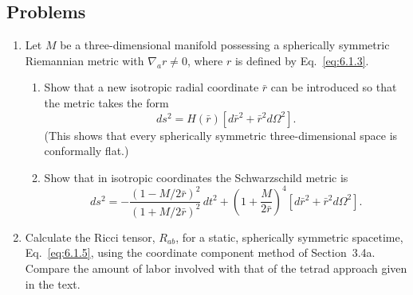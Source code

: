 
\subsection*{Problems}

\begin{enumerate}[label=\arabic*., leftmargin=*, itemsep=1.1em]
\item Let \(M\) be a three-dimensional manifold possessing a spherically
  symmetric Riemannian metric with \(\nabla_a r\ne0\), where \(r\) is defined by
  Eq.~\eqref{eq:6.1.3}.
  \begin{enumerate}[label=\alph*), leftmargin=2.2em, itemsep=.45em]
  \item Show that a new isotropic radial coordinate \(\bar r\) can be introduced
    so that the metric takes the form
    \[
      ds^2=H(\bar r)[d\bar r^2+\bar r^2d\Omega^2].
    \]
    (This shows that every spherically symmetric three-dimensional space is
    conformally flat.)
  \item Show that in isotropic coordinates the Schwarzschild metric is
    \[
      ds^2=-\frac{(1-M/2\bar r)^2}{(1+M/2\bar r)^2}\,dt^2+
      \left(1+\frac{M}{2\bar r}\right)^4
      [d\bar r^2+\bar r^2d\Omega^2].
    \]
  \end{enumerate}

\item Calculate the Ricci tensor, \(R_{ab}\), for a static, spherically symmetric
  spacetime, Eq.~\eqref{eq:6.1.5}, using the coordinate component method of
  Section~3.4a. Compare the amount of labor involved with that of the tetrad
  approach given in the text.


\end{enumerate}
